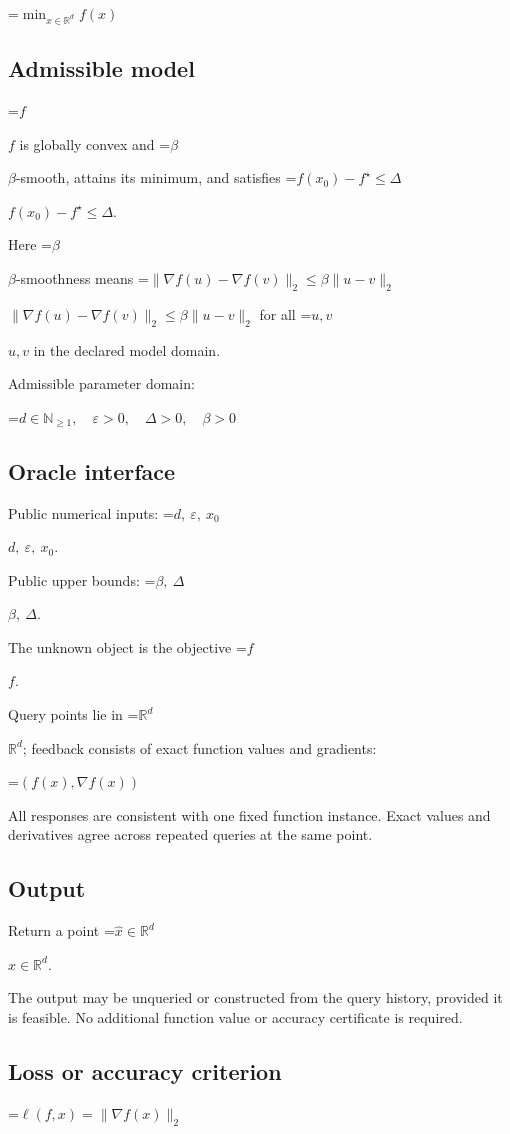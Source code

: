 \documentclass[10pt,a4paper]{article}
\newcommand{\AtlasMath}[1]{\par\begingroup\centering\setbox0=\hbox{$\displaystyle #1$}\ifdim\wd0>1.4\linewidth\typeout{ATLAS WIDE FORMULA: \the\wd0}\fi\ifdim\wd0>\linewidth\resizebox{\linewidth}{!}{\box0}\else\box0\fi\par\endgroup}
\newcommand{\AtlasInlineMath}[1]{\begingroup\setbox0=\hbox{$#1$}\ifdim\wd0>.4\linewidth\endgroup\AtlasMath{#1}\else\endgroup$#1$\fi}
\begin{document}
\AtlasMath{\min_{x\in \mathbb{R}^d}f(x)}


\subsection{Admissible model}
\AtlasInlineMath{f} is globally convex and \AtlasInlineMath{\beta}-smooth, attains its minimum, and satisfies \AtlasInlineMath{f(x_0)-f^\star\le\Delta}.

Here \AtlasInlineMath{\beta}-smoothness means \AtlasInlineMath{\|\nabla f(u)-\nabla f(v)\|_2\le\beta\|u-v\|_2} for all \AtlasInlineMath{u,v} in the declared model domain.

Admissible parameter domain:


\AtlasMath{d\in\mathbb{N}_{\ge1},\quad \varepsilon>0,\quad \Delta>0,\quad \beta>0}


\subsection{Oracle interface}
Public numerical inputs: \AtlasInlineMath{d,\ \varepsilon,\ x_0}.

Public upper bounds: \AtlasInlineMath{\beta,\ \Delta}.

The unknown object is the objective \AtlasInlineMath{f}.

Query points lie in \AtlasInlineMath{\mathbb{R}^d}; feedback consists of exact function values and gradients:


\AtlasMath{(f(x),\nabla f(x))}


All responses are consistent with one fixed function instance. Exact values and derivatives agree across repeated queries at the same point.

\subsection{Output}
Return a point \AtlasInlineMath{\widehat x\in\mathbb R^d}.

The output may be unqueried or constructed from the query history, provided it is feasible. No additional function value or accuracy certificate is required.

\subsection{Loss or accuracy criterion}

\AtlasMath{\ell(f,x)=\|\nabla f(x)\|_2}
\end{document}
